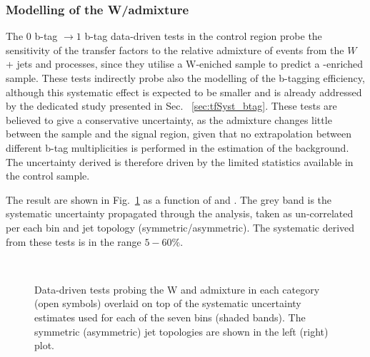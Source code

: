 \subsubsection*{Modelling of the W/\ttbar admixture}
\label{sec:tfSyst_WttAd}
The $0$ b-tag $\rightarrow1$ b-tag data-driven tests in the \mj control region 
probe the sensitivity of the transfer factors to the relative
admixture of events from the $W$ + jets and \ttbar processes, 
since they utilise a W-eniched sample to predict a \ttbar-enriched sample. 
These tests indirectly probe also the modelling of the b-tagging efficiency, 
although this systematic effect is expected to be smaller and is already addressed 
by the dedicated study presented in Sec. ~\ref{sec:tfSyst_btag}.
These tests are believed to give a conservative uncertainty, 
as the admixture changes little between the \mj sample and the signal region, 
given that no extrapolation between different b-tag multiplicities is performed 
in the estimation of the background. 
The uncertainty derived is therefore driven by the limited statistics available in the control sample. 

The result are shown in Fig.~\ref{fig:closureBTag} as a function of \scalht and \njet. 
The grey band is the systematic uncertainty propagated through the analysis, 
taken as un-correlated per each \scalht bin and jet topology (symmetric/asymmetric). The systematic derived from these tests is
in the range $5-60\%$.

\begin{figure}[h!]
  \begin{center}
    ~~
    \caption{Data-driven tests probing the W and \ttbar admixture 
      in each \njet category (open symbols) overlaid on top of the systematic
      uncertainty estimates used for each of the seven \scalht bins
      (shaded bands). 
      The symmetric (asymmetric) jet topologies are shown in the left (right) plot.      
    }
    \label{fig:closureBTag}
  \end{center} 
\end{figure}


